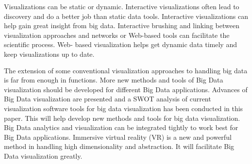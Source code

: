 Visualizations can be static or dynamic. Interactive visualizations often lead to discovery and do a better job than static data tools. Interactive visualizations can help gain great insight from big data. Interactive brushing and linking between visualization approaches and networks or Web-based tools can facilitate the scientific process. Web- based visualization helps get dynamic data timely and keep visualizations up to date.
\par
The extension of some conventional visualization
approaches to handling big data is far from enough in
functions. More new methods and tools of Big Data
visualization should be developed for different Big Data
applications. Advances of Big Data visualization are
presented and a SWOT analysis of current visualization
software tools for big data visualization has been
conducted in this paper. This will help develop new
methods and tools for big data visualization. Big Data
analytics and visualization can be integrated tightly to
work best for Big Data applications. Immersive virtual
reality (VR) is a new and powerful method in handling
high dimensionality and abstraction. It will facilitate Big
Data visualization greatly.